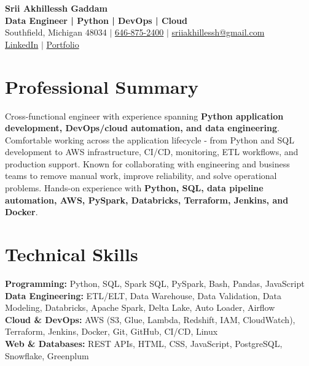 \documentclass[letterpaper,10pt]{article}
\begin{document}
\fontsize{9.35pt}{10.45pt}\selectfont

\begin{center}
    {\LARGE \textbf{Srii Akhillessh Gaddam}} \\[-1pt]
    \textbf{Data Engineer | Python | DevOps | Cloud} \\[2pt]
    Southfield, Michigan 48034 $|$
    \href{tel:6468752400}{646-875-2400} $|$
    \href{mailto:sriiakhillessh@gmail.com}{sriiakhillessh@gmail.com} \\[1pt]
    \href{https://www.linkedin.com/in/srii-akhiilessh-gaddam-b48668191/}{LinkedIn} $|$
    \href{https://sriiakhillesshg.github.io/portfolio/}{Portfolio}
\end{center}
\vspace{-8pt}

\section{Professional Summary}
\small{Cross-functional engineer with experience spanning \textbf{Python application development, DevOps/cloud automation, and data engineering}. Comfortable working across the application lifecycle - from Python and SQL development to AWS infrastructure, CI/CD, monitoring, ETL workflows, and production support. Known for collaborating with engineering and business teams to remove manual work, improve reliability, and solve operational problems. Hands-on experience with \textbf{Python, SQL, data pipeline automation, AWS, PySpark, Databricks, Terraform, Jenkins, and Docker}.}

\section{Technical Skills}
\small{
\textbf{Programming:} Python, SQL, Spark SQL, PySpark, Bash, Pandas, JavaScript \\
\textbf{Data Engineering:} ETL/ELT, Data Warehouse, Data Validation, Data Modeling, Databricks, Apache Spark, Delta Lake, Auto Loader, Airflow \\
\textbf{Cloud \& DevOps:} AWS (S3, Glue, Lambda, Redshift, IAM, CloudWatch), Terraform, Jenkins, Docker, Git, GitHub, CI/CD, Linux \\
\textbf{Web \& Databases:} REST APIs, HTML, CSS, JavaScript, PostgreSQL, Snowflake, Greenplum
}
\end{document}
